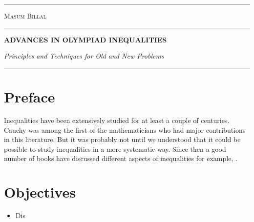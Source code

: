 \documentclass[a4paper, 12pt]{book}
\newlength{\drop}
\newlength{\tpheight}\setlength{\tpheight}{0.9\textheight}
\newlength{\txtheight}\setlength{\txtheight}{0.9\tpheight}
\newlength{\tpwidth}\setlength{\tpwidth}{0.9\textwidth}
\newlength{\txtwidth}\setlength{\txtwidth}{0.9\tpwidth}
\theoremstyle{definition}
\numberwithin{problem}{chapter}
\begin{document}
	\frontmatter
	\begin{titlepage}
		\txtheight
		\begin{minipage}[t]{0.05\txtwidth}
			\color{black}
			\rule{6pt}{\txtheight}
		\end{minipage}
		\hspace{0.05\txtwidth}
		\begin{minipage}[t]{2\txtwidth}
			\vspace*{\drop}
			{\Large {\scshape Masum Billal} %
			} 
			\\
			\rule{1\txtwidth}{1pt} \par
			\vspace{3\baselineskip}
			{\noindent\bfseries ADVANCES IN OLYMPIAD INEQUALITIES} \par
			\vspace{2\baselineskip}
			{\large\itshape Principles and Techniques for Old and New Problems} \par
			\vspace{6.5\baselineskip}
			{\scshape } \par
			\vspace{0.1\baselineskip}
			{\Large } \par
			\vspace{\baselineskip}
			\rule{\txtwidth}{1pt} \par
			\vspace{\baselineskip}
			{\Large }
		\end{minipage}
		\hfill
	\end{titlepage}

		\section*{Preface}

		Inequalities have been extensively studied for at least a couple of centuries. Cauchy was among the first of the mathematicians who had major contributions in this literature. But it was probably not until \textcite{hardy_littlewood_polya_1934} we understood that it could be possible to study inequalities in a more systematic way. Since then a good number of books have discussed different aspects of inequalities for example, \textcite{beckenbach_bellman_1983}.

		\section*{Objectives}
			\begin{itemize}
				\item Dis
			\end{itemize}
	\tableofcontents
	\mainmatter
\end{document}
